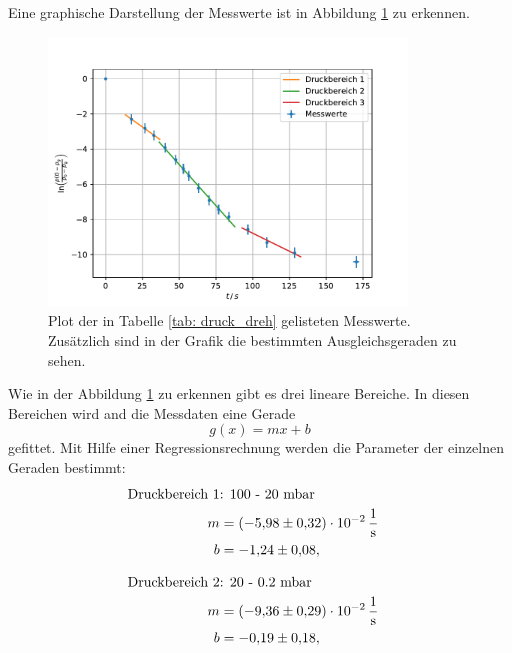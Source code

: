 Eine graphische Darstellung der Messwerte ist in Abbildung \ref{fig: druck_dreh} zu erkennen.

\FloatBarrier
\begin{figure}[h]
  \centering
  \includegraphics[width=0.85\textwidth]{../Messdaten/plots/dreh/druckplot_drehschieber.pdf}
  \caption{Plot der in Tabelle \ref{tab: druck_dreh} gelisteten Messwerte. Zusätzlich sind in der Grafik die bestimmten Ausgleichsgeraden zu sehen.}
  \label{fig: druck_dreh}
\end{figure}
\FloatBarrier

Wie in der Abbildung \ref{fig: druck_dreh} zu erkennen gibt es drei lineare Bereiche.
In diesen Bereichen wird and die Messdaten eine Gerade
\begin{equation}
  \label{eq: geradengleichung}
  g(x)=mx+b
\end{equation}
gefittet. Mit Hilfe einer Regressionsrechnung werden die Parameter der einzelnen Geraden bestimmt:
\begin{align}
  \label{eq: regression_dreh_druck_1}
  \begin{aligned}
  \text{Druckbereich 1} &\text{: 100 - 20 mbar}& \\
  m&=\SI{-5.98\pm0.32 e-2}{\per\second} \\
  b&=\num{-1.24 \pm0.08 },
\end{aligned}
\end{align}

\begin{align}
  \label{eq: regression_dreh_druck_2}
  \begin{aligned}
  \text{Druckbereich 2} &\text{: 20 - 0.2 mbar}& \\
  m&=\SI{-9.36\pm0.29 e-2}{\per\second} \\
  b&=\num{-0.19 \pm0.18 },
\end{aligned}
\end{align}


